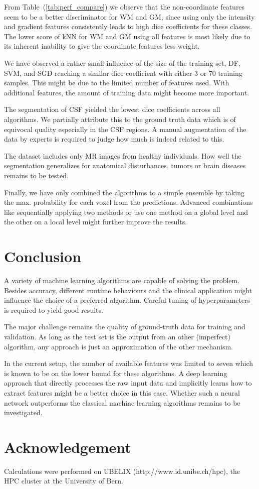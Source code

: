 \documentclass[journal]{IEEEtran}
\begin{document}
From Table~(\ref{tab:perf_compare}) we observe that the non-coordinate features seem to be a better discriminator for WM and GM, since using only the intensity and gradient features consistently leads to high dice coefficients for these classes. The lower score of kNN for WM and GM using all features is most likely due to its inherent inability to give the coordinate features less weight.

We have observed a rather small influence of the size of the training set, DF, SVM, and SGD reaching a similar dice coefficient with either 3 or 70 training samples. This might be due to the limited number of features used. With additional features, the amount of training data might become more important.

The segmentation of CSF yielded the lowest dice coefficients across all algorithms. We partially attribute this to the ground truth data which is of equivocal quality especially in the CSF regions. A manual augmentation of the data by experts is required to judge how much is indeed related to this.

The dataset includes only MR images from healthy individuals. How well the segmentation generalizes for anatomical disturbances, tumors or brain diseases remains to be tested.

Finally, we have only combined the algorithms to a simple ensemble by taking the max. probability for each voxel from the predictions. Advanced combinations like sequentially applying two methods or use one method on a global level and the other on a local level might further improve the results.

\section{Conclusion}
A variety of machine learning algorithms are capable of solving the problem. Besides accuracy, different runtime behaviours and the clinical application might influence the choice of a preferred algorithm. Careful tuning of hyperparameters is required to yield good results.

The major challenge remains the quality of ground-truth data for training and validation. As long as the test set is the output from an other (imperfect) algorithm, any approach is just an approximation of the other mechanism.

In the current setup, the number of available features was limited to seven which is known to be on the lower bound for these algorithms. A deep learning approach that directly processes the raw input data and implicitly learns how to extract features might be a better choice in this case. Whether such a neural network outperforms the classical machine learning algorithms remains to be investigated.

\section*{Acknowledgement}
Calculations were performed on UBELIX (http://www.id.unibe.ch/hpc), the HPC cluster at the University of Bern.



\end{document}

